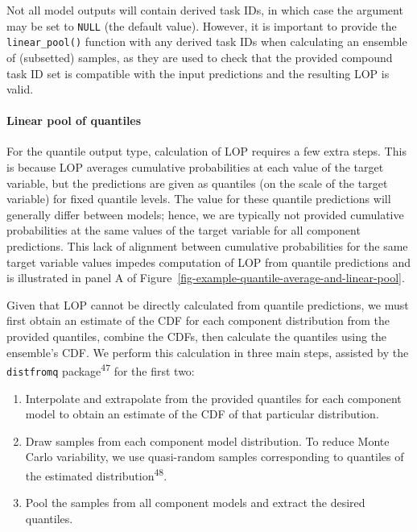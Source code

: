 \documentclass[
]{article}
\let\oldparagraph\paragraph
\renewcommand{\paragraph}[1]{\oldparagraph{#1}\mbox{}}
\providecommand{\tightlist}{%
  \setlength{\itemsep}{0pt}\setlength{\parskip}{0pt}}\usepackage{longtable,booktabs,array}
\begin{document}
Not all model outputs will contain derived task IDs, in which case the
argument may be set to \texttt{NULL} (the default value). However, it is
important to provide the \texttt{linear\_pool()} function with any
derived task IDs when calculating an ensemble of (subsetted) samples, as
they are used to check that the provided compound task ID set is
compatible with the input predictions and the resulting LOP is valid.

\paragraph{Linear pool of quantiles}\label{linear-pool-of-quantiles}

For the quantile output type, calculation of LOP requires a few extra
steps. This is because LOP averages cumulative probabilities at each
value of the target variable, but the predictions are given as quantiles
(on the scale of the target variable) for fixed quantile levels. The
value for these quantile predictions will generally differ between
models; hence, we are typically not provided cumulative probabilities at
the same values of the target variable for all component predictions.
This lack of alignment between cumulative probabilities for the same
target variable values impedes computation of LOP from quantile
predictions and is illustrated in panel A of
Figure~\ref{fig-example-quantile-average-and-linear-pool}.

Given that LOP cannot be directly calculated from quantile predictions,
we must first obtain an estimate of the CDF for each component
distribution from the provided quantiles, combine the CDFs, then
calculate the quantiles using the ensemble's CDF. We perform this
calculation in three main steps, assisted by the \texttt{distfromq}
package\textsuperscript{47} for the first two:

\begin{enumerate}
\def\labelenumi{\arabic{enumi}.}
\tightlist
\item
  Interpolate and extrapolate from the provided quantiles for each
  component model to obtain an estimate of the CDF of that particular
  distribution.
\item
  Draw samples from each component model distribution. To reduce Monte
  Carlo variability, we use quasi-random samples corresponding to
  quantiles of the estimated distribution\textsuperscript{48}.
\item
  Pool the samples from all component models and extract the desired
  quantiles.
\end{enumerate}
\end{document}
